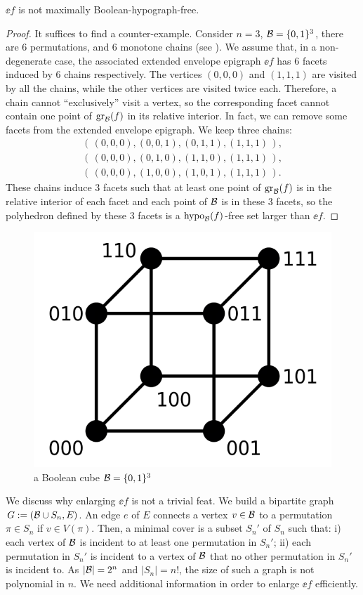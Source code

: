  \begin{proposition}
  $\ee{f}$ is  not maximally Boolean-hypograph-free.
 \end{proposition}
 \begin{proof}
 It suffices to find a counter-example.
  Consider $n=3$, $\mathcal B = \{0,1\}^3$, there are 6 permutations, and 6 monotone chains (see ). We assume that, in a non-degenerate case, the associated extended envelope epigraph $\ee{f}$ has 6 facets induced by 6 chains respectively. The vertices $(0,0,0)$ and $(1,1,1)$ are visited by all the chains, while the other vertices are visited twice each. Therefore, a chain cannot  ``exclusively'' visit a vertex, so the corresponding facet  cannot contain one point of  $\operatorname{gr}_{\mathcal B}(f)$ in its relative interior. In fact, we can remove some facets from  the extended envelope epigraph. We keep three chains:
\begin{eqnarray*}
 \left(\,(0,0,0) , (0,0,1) , (0,1,1) , (1,1,1)\,\right), \\
 \left(\,(0,0,0) , (0,1,0) , (1,1,0) , (1,1,1)\,\right), \\
 \left(\,(0,0,0) , (1,0,0) , (1,0,1) , (1,1,1)\,\right).
\end{eqnarray*}
 These chains induce 3 facets such that at least one point of  $\operatorname{gr}_{\mathcal B}(f)$ is in the relative interior of each facet and each point of $\mathcal B$ is in these 3 facets, so the polyhedron defined by these 3 facets is a $\operatorname{hypo}_{\mathcal B}(f)$-free set larger than $\ee{f}$.
 \end{proof}

\begin{figure}[!ht]
\centering
\captionsetup{justification=centering}
\includegraphics[width = 0.3\columnwidth]{Chaptersub/media/Hamming.png}
\caption{a Boolean cube $\mathcal B = \{0,1\}^3$ \textcopyright\xspace \cite{pict}}
\label{fig.ham}
\end{figure}

We discuss why enlarging $\ee{f}$ is not a trivial feat. We build a bipartite graph $G:=(\mathcal B \cup S_n, E)$. An edge $e$ of $E$ connects a vertex $v \in \mathcal B$ to a permutation $\pi \in S_n$ if  $v \in V(\pi)$. Then, a minimal cover is a subset $S_n'$  of  $S_n$ such that: i) each vertex of $\mathcal B$ is incident to at least one permutation in $S_n'$; ii) each permutation in $S_n'$ is incident to a vertex of $\mathcal B$ that no other permutation in  $S_n'$ is incident to. As $|\mathcal B| = 2^n$ and $|S_n|=n!$, the size of such a graph is not polynomial in $n$. We need additional information in order to enlarge $\ee{f}$ efficiently.


